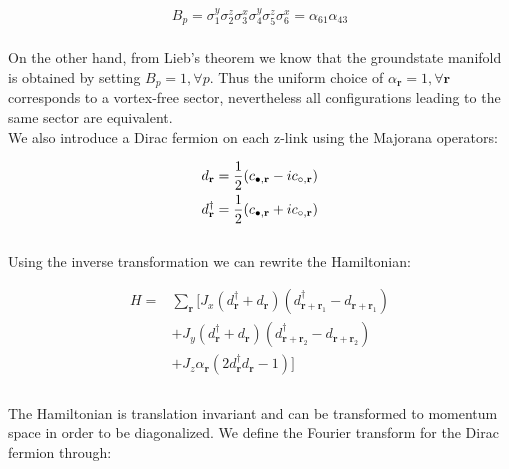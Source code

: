 \documentclass{article}
\begin{document}
\begin{equation}\label{eq:10}
	\begin{aligned}
		B_p = \sigma^y_1\sigma^z_2\sigma^x_3\sigma^y_4\sigma^z_5\sigma^x_6 = \alpha_{61}\alpha_{43}\\
	\end{aligned}
\end{equation}

\noindent On the other hand, from Lieb's theorem \cite{Lieb_1994} we know that the groundstate manifold is obtained by setting $B_p = 1, \forall p$. 
Thus the uniform choice of $\alpha_\textbf{r}=1, \forall \textbf{r}$ corresponds to a vortex-free sector, nevertheless all configurations leading to the same sector are equivalent.\\

\noindent We also introduce a Dirac fermion on each z-link using the Majorana operators:

\begin{equation}\label{eq:11}
	\begin{aligned}
		d_\textbf{r} &= \frac{1}{2} (c_{\color{black}\bullet,\textbf{r}} - ic_{\circ,\textbf{r}})\\
		d^\dagger_\textbf{r} &= \frac{1}{2} (c_{\color{black}\bullet,\textbf{r}} + ic_{\circ,\textbf{r}})
	\end{aligned}
\end{equation}\\

\noindent Using the inverse transformation we can rewrite the Hamiltonian:

\begin{equation}\label{eq:12}
	\begin{aligned}
		H= &\sum_{\textbf{r}}[J_x (d^\dagger_{\textbf{r}} + d_{\textbf{r}})(d^\dagger_{\textbf{r}+\textbf{r}_1} - d_{\textbf{r}+\textbf{r}_1}) \\
		&+J_y (d^\dagger_{\textbf{r}} + d_{\textbf{r}})(d^\dagger_{\textbf{r}+\textbf{r}_2} - d_{\textbf{r}+\textbf{r}_2}) \\
		&+J_z \alpha_\textbf{r}(2d^\dagger_{\textbf{r}}d_{\textbf{r}}-1)]\\ 
	\end{aligned}
\end{equation}\\

\noindent The Hamiltonian is translation invariant and can be transformed to momentum space in order to be diagonalized. We define the Fourier transform for the Dirac fermion through:
\end{document}
